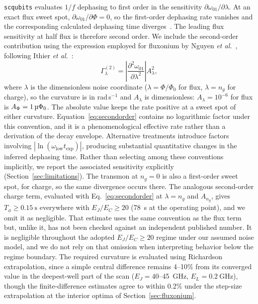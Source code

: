 \documentclass{SciPost}
\providecommand{\upmu}{\text{\fontencoding{TS1}\selectfont\char181}}
\begin{document}
\texttt{scqubits} evaluates $1/f$ dephasing to first order in the sensitivity
$\partial\omega_{01}/\partial\lambda$. At an exact flux sweet spot,
$\partial\omega_{01}/\partial\Phi=0$, so the first-order dephasing rate vanishes and the
corresponding calculated dephasing time diverges~\cite{groszkowski2021}. The leading flux
sensitivity at half flux is therefore second order. We include the second-order contribution
using the expression employed for fluxonium by Nguyen \emph{et al.}~\cite{nguyen2019}, following
Ithier \emph{et al.}~\cite{ithier2005}:
\begin{equation}
\Gamma_\lambda^{(2)} = \left|\frac{\partial^2\omega_{01}}{\partial\lambda^2}\right| A_\lambda^2 ,
\label{eq:secondorder}
\end{equation}
where $\lambda$ is the dimensionless noise coordinate ($\lambda=\Phi/\Phi_0$ for flux, $\lambda=n_g$
for charge), so the curvature is in rad\,s$^{-1}$ and $A_\lambda$ is dimensionless: $A_\lambda=10^{-6}$
for flux is $A_\Phi=1\,\upmu\Phi_0$. The absolute value keeps the rate positive at a sweet spot of either curvature.
Equation~\eqref{eq:secondorder} contains no logarithmic factor under this convention, and it is a
phenomenological effective rate rather than a derivation of the decay envelope. Alternative
treatments introduce factors involving $|\ln(\omega_{\mathrm{low}}t_{\mathrm{exp}})|$, producing
substantial quantitative changes in the inferred dephasing time. Rather than selecting among these
conventions implicitly, we report the associated sensitivity explicitly
(Section~\ref{sec:limitations}). The transmon at $n_g=0$ is also a first-order sweet spot, for
charge, so the same divergence occurs there. The analogous second-order charge term, evaluated
with Eq.~\eqref{eq:secondorder} at $\lambda=n_g$ and $A_{n_g}$, gives $T_\phi\ge\SI{0.15}{\second}$ everywhere with
$E_J/E_C\ge20$ (\SI{78}{\second} at the operating point), and we omit it as negligible. That estimate uses the same convention as the flux term but, unlike
it, has not been checked against an independent published number. It is negligible throughout the adopted $E_J/E_C\ge20$ regime under our assumed noise model, and we
do not rely on that omission when interpreting behavior below the regime boundary. The required curvature is evaluated using Richardson
extrapolation, since a simple central difference remains 4--10\% from its converged value in the
deepest-well part of the scan ($E_J=40$--\SI{45}{\giga\hertz}, $E_L=\SI{0.2}{\giga\hertz}$),
though the finite-difference estimates agree to within 0.2\% under the step-size extrapolation at
the interior optima of Section~\ref{sec:fluxonium}.
\end{document}
